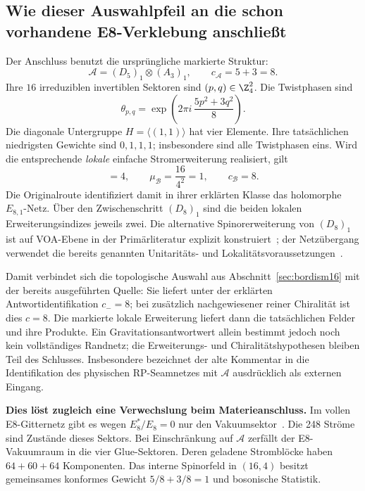 \subsection{Wie dieser Auswahlpfeil an die schon vorhandene E8-Verklebung anschließt}
Der Anschluss benutzt die ursprüngliche markierte Struktur:
\begin{equation}
\mathcal A=(D_5)_1\otimes(A_3)_1,\qquad c_{\mathcal A}=5+3=8.
\end{equation}
Ihre $16$ irreduziblen invertiblen Sektoren sind $(p,q)\in\Z_4^2$. Die Twistphasen sind
\begin{equation}
\theta_{p,q}=\exp\!\left(2\pi i\,\frac{5p^2+3q^2}{8}\right).
\end{equation}
Die diagonale Untergruppe $H=\langle(1,1)\rangle$ hat vier Elemente. Ihre tatsächlichen niedrigsten Gewichte sind $0,1,1,1$; insbesondere sind alle Twistphasen eins. Wird die entsprechende \emph{lokale} einfache Stromerweiterung realisiert, gilt
\begin{equation}
[\mathcal B:\mathcal A]=4,\qquad
\mu_{\mathcal B}=\frac{16}{4^2}=1,\qquad
c_{\mathcal B}=8.
\end{equation}
Die Originalroute identifiziert damit in ihrer erklärten Klasse das holomorphe $E_{8,1}$-Netz. Über den Zwischenschritt $(D_8)_1$ sind die beiden lokalen Erweiterungsindizes jeweils zwei. Die alternative Spinorerweiterung von $(D_8)_1$ ist auf VOA-Ebene in der Primärliteratur explizit konstruiert~\cite{chuzheng}; der Netzübergang verwendet die bereits genannten Unitaritäts- und Lokalitätsvoraussetzungen~\cite{cklw}.

Damit verbindet sich die topologische Auswahl aus Abschnitt~\ref{sec:bordism16} mit der bereits ausgeführten Quelle: Sie liefert unter der erklärten Antwortidentifikation $c_-=8$; bei zusätzlich nachgewiesener reiner Chiralität ist dies $c=8$. Die markierte lokale Erweiterung liefert dann die tatsächlichen Felder und ihre Produkte. Ein Gravitationsantwortwert allein bestimmt jedoch noch kein vollständiges Randnetz; die Erweiterungs- und Chiralitätshypothesen bleiben Teil des Schlusses. Insbesondere bezeichnet der alte Kommentar in  die Identifikation des physischen RP-Seamnetzes mit $\mathcal A$ ausdrücklich als externen Eingang.

\textbf{Dies löst zugleich eine Verwechslung beim Materieanschluss.} Im vollen E8-Gitternetz gibt es wegen $E_8^*/E_8=0$ nur den Vakuumsektor~\cite{dongxu}. Die 248 Ströme sind Zustände dieses Sektors. Bei Einschränkung auf $\mathcal A$ zerfällt der E8-Vakuumraum in die vier Glue-Sektoren. Deren geladene Stromblöcke haben $64+60+64$ Komponenten. Das interne Spinorfeld in $(16,4)$ besitzt gemeinsames konformes Gewicht $5/8+3/8=1$ und bosonische Statistik.

